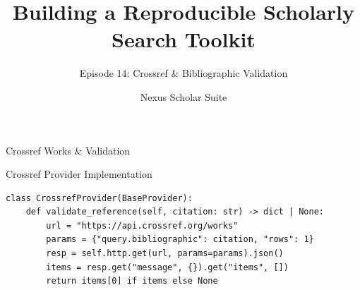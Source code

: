 \documentclass[aspectratio=169]{beamer}
\title{Building a Reproducible Scholarly Search Toolkit}
\subtitle{Episode 14: Crossref \& Bibliographic Validation}
\author{Nexus Scholar Suite}
\date{}
\begin{document}
\begin{frame}[plain]
  \titlepage
\end{frame}

\begin{frame}{Crossref Works \& Validation}
  \begin{center}
  \end{center}
\end{frame}

\begin{frame}[fragile]{Crossref Provider Implementation}
\begin{lstlisting}[style=nexuspython]
class CrossrefProvider(BaseProvider):
    def validate_reference(self, citation: str) -> dict | None:
        url = "https://api.crossref.org/works"
        params = {"query.bibliographic": citation, "rows": 1}
        resp = self.http.get(url, params=params).json()
        items = resp.get("message", {}).get("items", [])
        return items[0] if items else None
\end{lstlisting}
\end{frame}
\end{document}
